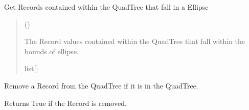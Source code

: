 \documentclass[letterpaper,10pt,english]{sphinxmanual}
\begin{document}
\begin{fulllineitems}
\begin{fulllineitems}
\label{\detokenize{quadtree:GeoSpatialTools.quadtree.QuadTree.query_ellipse}}
\pysigstartsignatures
\pysiglinewithargsret
{}
{\sphinxparamcomma {}}
{}
\pysigstopsignatures
\sphinxAtStartPar
Get Records contained within the QuadTree that fall in a
Ellipse
\begin{quote}\begin{description}
\sphinxAtStartPar
{} ({\hyperref[\detokenize{shape:GeoSpatialTools.shape.Ellipse}]{}})

\sphinxAtStartPar
The Record values contained within the QuadTree that fall
within the bounds of ellipse.

\sphinxAtStartPar
list{[}{\hyperref[\detokenize{record:GeoSpatialTools.record.Record}]{}}{]}

\end{description}\end{quote}

\end{fulllineitems}


\begin{fulllineitems}
\label{\detokenize{quadtree:GeoSpatialTools.quadtree.QuadTree.remove}}
\pysigstartsignatures
\pysiglinewithargsret
{}
{}
{}
\pysigstopsignatures
\sphinxAtStartPar
Remove a Record from the QuadTree if it is in the QuadTree.

\sphinxAtStartPar
Returns True if the Record is removed.
\begin{quote}\begin{description}
\sphinxAtStartPar
{}

\end{description}\end{quote}

\end{fulllineitems}


\end{fulllineitems}
\end{document}
